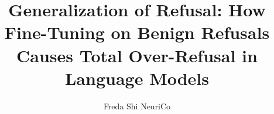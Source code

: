 \documentclass{article}
\title{Generalization of Refusal: How Fine-Tuning on Benign Refusals\\Causes Total Over-Refusal in Language Models}
\author{
  Freda Shi \And NeuriCo
}
\begin{document}
\maketitle

\begin{abstract}

\end{abstract}











\newpage
\appendix

\end{document}
